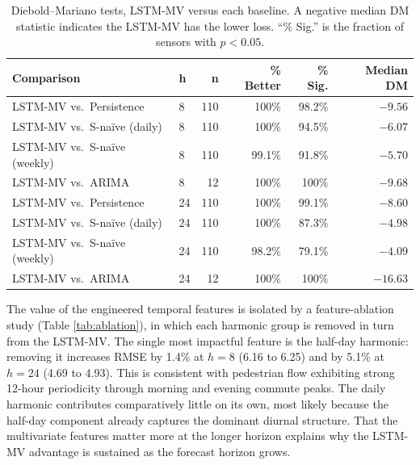 \documentclass[journal,sensors,submit,pdftex,moreauthors]{Definitions/mdpi}
\begin{document}
\begin{table}[htbp]
    \caption{Diebold--Mariano tests, LSTM-MV versus each baseline. A negative median DM statistic indicates the LSTM-MV has the lower loss. ``\% Sig.'' is the fraction of sensors with $p<0.05$.}
    \label{tab:dm}
    \begin{tabular}{@{}llrrrr@{}}
        \toprule
        \textbf{Comparison} & \textbf{h} & \textbf{n} & \textbf{\% Better} & \textbf{\% Sig.} & \textbf{Median DM} \\
        \midrule
        LSTM-MV vs.\ Persistence        & 8  & 110 & 100\%  & 98.2\% & $-9.56$ \\
        LSTM-MV vs.\ S-na\"ive (daily)  & 8  & 110 & 100\%  & 94.5\% & $-6.07$ \\
        LSTM-MV vs.\ S-na\"ive (weekly) & 8  & 110 & 99.1\% & 91.8\% & $-5.70$ \\
        LSTM-MV vs.\ ARIMA              & 8  & 12  & 100\%  & 100\%  & $-9.68$ \\
        LSTM-MV vs.\ Persistence        & 24 & 110 & 100\%  & 99.1\% & $-8.60$ \\
        LSTM-MV vs.\ S-na\"ive (daily)  & 24 & 110 & 100\%  & 87.3\% & $-4.98$ \\
        LSTM-MV vs.\ S-na\"ive (weekly) & 24 & 110 & 98.2\% & 79.1\% & $-4.09$ \\
        LSTM-MV vs.\ ARIMA              & 24 & 12  & 100\%  & 100\%  & $-16.63$ \\
        \bottomrule
    \end{tabular}
\end{table}

The value of the engineered temporal features is isolated by a feature-ablation study (Table \ref{tab:ablation}), in which each harmonic group is removed in turn from the LSTM-MV. The single most impactful feature is the half-day harmonic: removing it increases RMSE by 1.4\% at $h=8$ (6.16 to 6.25) and by 5.1\% at $h=24$ (4.69 to 4.93). This is consistent with pedestrian flow exhibiting strong 12-hour periodicity through morning and evening commute peaks. The daily harmonic contributes comparatively little on its own, most likely because the half-day component already captures the dominant diurnal structure. That the multivariate features matter more at the longer horizon explains why the LSTM-MV advantage is sustained as the forecast horizon grows.
\end{document}
